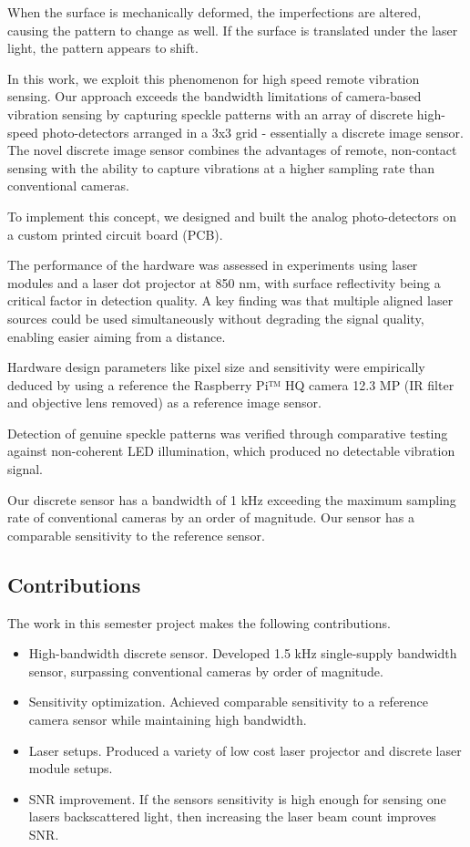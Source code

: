 When the surface is mechanically deformed, the imperfections are altered, causing the pattern to change as well. 
If the surface is translated under the laser light, the pattern appears to shift.

In this work, we exploit this phenomenon for high speed remote vibration sensing. Our approach exceeds the bandwidth limitations of camera-based vibration sensing by capturing 
speckle patterns with an array of discrete high-speed photo-detectors arranged in a 3x3 grid - essentially a discrete image sensor. The novel discrete image sensor combines the advantages of remote, 
non-contact sensing with the ability to capture vibrations at a higher sampling rate than conventional cameras.

To implement this concept, we designed and built the analog photo-detectors on a custom printed circuit board (PCB).

The performance of the hardware was assessed in experiments using laser modules and a laser dot projector at 850 \si{\nano\meter}, 
with surface reflectivity being a critical factor in detection quality. A key finding was that multiple aligned laser sources could be used simultaneously without degrading the signal quality, 
enabling easier aiming from a distance.

Hardware design parameters like pixel size and sensitivity were empirically deduced by using a reference the Raspberry Pi™ HQ camera 12.3 MP (IR filter and objective lens removed) as a reference image sensor.

Detection of genuine speckle patterns was verified through comparative testing against non-coherent LED illumination, which produced no detectable vibration signal.

Our discrete sensor has a bandwidth of 1 \si{\kilo\hertz} exceeding the maximum sampling rate of conventional cameras by an order of magnitude. Our sensor has a comparable sensitivity to the reference sensor. 

\subsection{Contributions}

The work in this semester project makes the following contributions.

\begin{itemize}
    \item High-bandwidth discrete sensor. Developed 1.5 kHz single-supply bandwidth sensor, surpassing conventional cameras by order of magnitude.
    \item Sensitivity optimization. Achieved comparable sensitivity to a reference camera sensor while maintaining high bandwidth.
    \item Laser setups. Produced a variety of low cost laser projector and discrete laser module setups.
    \item SNR improvement. If the sensors sensitivity is high enough for sensing one lasers backscattered light, then increasing the laser beam count improves SNR.
\end{itemize}